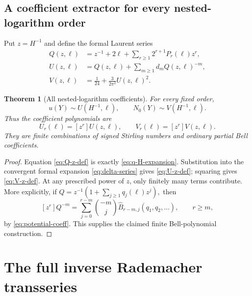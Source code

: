\documentclass[11pt]{article}
\numberwithin{equation}{section}
\theoremstyle{mainthm}
\newtheorem{theorem}{Theorem}[section]
\theoremstyle{defstyle}
\theoremstyle{remark}
\begin{document}
\subsection{A coefficient extractor for every nested-logarithm order}

Put \(z=H^{-1}\) and define the formal Laurent series
\begin{align}
 Q(z,\ell)
 &=z^{-1}+2\ell+\sum_{r\ge1}2^{r+1}P_r(\ell)z^r,
 \label{eq:Q-z-def}\\
 U(z,\ell)
 &=Q(z,\ell)+\sum_{m\ge1}d_mQ(z,\ell)^{-m},
 \label{eq:U-z-def}\\
 V(z,\ell)
 &=\frac1{24}+\frac{3}{2\pi^2}U(z,\ell)^2.
 \label{eq:V-z-def}
\end{align}

\begin{theorem}[All nested-logarithm coefficients]\label{thm:nested-log-coefficients}
For every fixed order,
\begin{equation}\label{eq:nested-log-extract}
 u(Y)\sim U(H^{-1},\ell),
 \qquad
 N_0(Y)\sim V(H^{-1},\ell).
\end{equation}
Thus the coefficient polynomials are
\begin{equation}\label{eq:U-V-coefficients}
 U_r(\ell)=[z^r]U(z,\ell),
 \qquad
 V_r(\ell)=[z^r]V(z,\ell).
\end{equation}
They are finite combinations of signed Stirling numbers and ordinary partial Bell coefficients.
\end{theorem}

\begin{proof}
Equation \eqref{eq:Q-z-def} is exactly \eqref{eq:q-H-expansion}.  Substitution into the convergent formal expansion \eqref{eq:delta-series} gives \eqref{eq:U-z-def}; squaring gives \eqref{eq:V-z-def}.  At any prescribed power of \(z\), only finitely many terms contribute.  More explicitly, if
\(
 Q=z^{-1}(1+\sum_{j\ge1}q_j(\ell)z^j),
\)
then
\begin{equation}\label{eq:inverse-power-Q-bell}
 [z^r]Q^{-m}
 =\sum_{j=0}^{r-m}\binom{-m}{j}
 \widehat B_{r-m,j}(q_1,q_2,\ldots),
 \qquad r\ge m,
\end{equation}
by \eqref{eq:potential-coeff}.  This supplies the claimed finite Bell-polynomial construction.
\end{proof}

\section{The full inverse Rademacher transseries}\label{sec:full-inverse}
\end{document}
